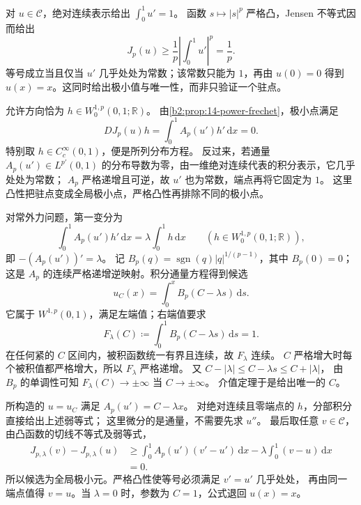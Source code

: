 \begin{solution}
对 \(u\in\mathcal C\)，绝对连续表示给出 \(\int_0^1u'=1\)。
函数 \(s\mapsto|s|^p\) 严格凸，Jensen 不等式因而给出
\[
 J_p(u)\geq\frac1p\left|\int_0^1u'\right|^p=\frac1p.
\]
等号成立当且仅当 \(u'\) 几乎处处为常数；该常数只能为 \(1\)，再由 \(u(0)=0\)
得到 \(u(x)=x\)。这同时给出极小值与唯一性，而非只验证一个驻点。

允许方向恰为 \(h\in W_0^{1,p}(0,1;\mathbb R)\)。
由\cref{b2:prop:14-power-frechet}，极小点满足
\[
 DJ_p(u)h=\int_0^1A_p(u')h'\,\mathrm{d}x=0.
\]
特别取 \(h\in C_c^\infty(0,1)\)，便是所列分布方程。
反过来，若通量 \(A_p(u')\in L^{p'}(0,1)\) 的分布导数为零，由一维绝对连续代表的积分表示，它几乎处处为常数；
\(A_p\) 严格递增且可逆，故 \(u'\) 也为常数，端点再将它固定为 \(1\)。
这里凸性把驻点变成全局极小点，严格凸性再排除不同的极小点。

对常外力问题，第一变分为
\[
 \int_0^1 A_p(u')h'\,\mathrm{d}x
       =\lambda\int_0^1h\,\mathrm{d}x
 \qquad(h\in W_0^{1,p}(0,1;\mathbb R)),
\]
即 \(-(A_p(u'))'=\lambda\)。
记 \(B_p(q)=\operatorname{sgn}(q)|q|^{1/(p-1)}\)，其中 \(B_p(0)=0\)；
这是 \(A_p\) 的连续严格递增逆映射。积分通量方程得到候选
\[
 u_C(x)=\int_0^x B_p(C-\lambda s)\,\mathrm{d}s.
\]
它属于 \(W^{1,p}(0,1)\)，满足左端值；右端值要求
\[
 F_\lambda(C)\coloneqq\int_0^1 B_p(C-\lambda s)\,\mathrm{d}s=1.
\]
在任何紧的 \(C\) 区间内，被积函数统一有界且连续，故 \(F_\lambda\) 连续。
\(C\) 严格增大时每个被积值都严格增大，所以 \(F_\lambda\) 严格递增。
又 \(C-|\lambda|\leq C-\lambda s\leq C+|\lambda|\)，
由 \(B_p\) 的单调性可知 \(F_\lambda(C)\to\pm\infty\) 当 \(C\to\pm\infty\)。
介值定理于是给出唯一的 \(C\)。

所构造的 \(u=u_C\) 满足 \(A_p(u')=C-\lambda x\)。
对绝对连续且零端点的 \(h\)，分部积分直接给出上述弱等式；
这里微分的是通量，不需要先求 \(u''\)。
最后取任意 \(v\in\mathcal C\)，由凸函数的切线不等式及弱等式，
\[
 \begin{aligned}
 J_{p,\lambda}(v)-J_{p,\lambda}(u)
 &\geq\int_0^1A_p(u')(v'-u')\,\mathrm{d}x
          -\lambda\int_0^1(v-u)\,\mathrm{d}x\\
 &=0.
 \end{aligned}
\]
所以候选为全局极小元。严格凸性使等号必须满足 \(v'=u'\) 几乎处处，
再由同一端点值得 \(v=u\)。当 \(\lambda=0\) 时，参数为 \(C=1\)，公式退回 \(u(x)=x\)。
\end{solution}

